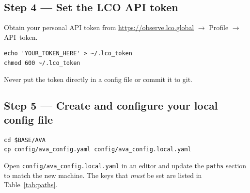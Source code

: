 \documentclass[12pt,a4paper]{article}
\begin{document}
\subsection{Step 4 --- Set the LCO API token}

Obtain your personal API token from
\url{https://observe.lco.global} $\to$ Profile $\to$ API~token.

\begin{lstlisting}[style=shell]
echo 'YOUR_TOKEN_HERE' > ~/.lco_token
chmod 600 ~/.lco_token
\end{lstlisting}

\begin{warnbox}
Never put the token directly in a config file or commit it to git.
\end{warnbox}

\subsection{Step 5 --- Create and configure your local config file}

\begin{lstlisting}[style=shell]
cd $BASE/AVA
cp config/ava_config.yaml config/ava_config.local.yaml
\end{lstlisting}

Open \texttt{config/ava\_config.local.yaml} in an editor and update the
\texttt{paths} section to match the new machine.  The keys that \emph{must}
be set are listed in Table~\ref{tab:paths}.
\end{document}
